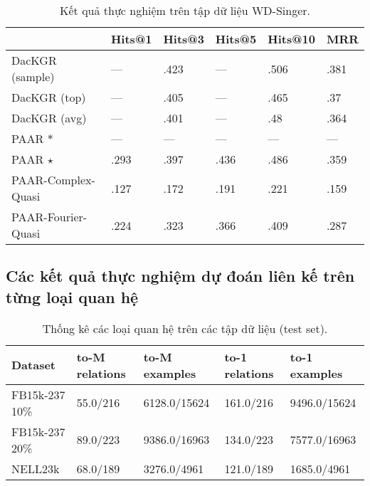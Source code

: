 \begin{center}
    \begin{table}[H]
        \centering
        \caption{Kết quả thực nghiệm trên tập dữ liệu WD-Singer.}
        \begin{tabular}{llllll}
            \toprule
         & Hits@1 & Hits@3 & Hits@5 & Hits@10 & MRR \\
            \midrule
         DacKGR (sample) & --- &  .423 & --- &  .506 &  .381\\
         DacKGR (top) & --- &  .405 &---  &  .465 & .37 \\
         DacKGR (avg) & --- & .401 & --- &  .48 & .364 \\
         PAAR $\ast$& --- & --- & --- & --- &  ---\\
         PAAR $\star$& .293 & .397 &.436 &.486&.359\\
         PAAR-Complex-Quasi &.127 &.172&.191&.221&.159\\
         PAAR-Fourier-Quasi & .224 & .323 & .366 & .409 & .287  \\
         \bottomrule
        \end{tabular}
    \end{table}
\end{center}

\subsection{Các kết quả thực nghiệm dự đoán liên kế trên từng loại quan hệ}


\begin{center}
    \begin{table}[H]
        \centering
        \caption{Thống kê các loại quan hệ trên các tập dữ liệu (test set).}
        \begin{tabular}{lllll}
        \toprule
        Dataset & to-M relations & to-M examples & to-1 relations & to-1 examples \\
        \midrule
        FB15k-237 10\%& 55.0/216 & 6128.0/15624 &  161.0/216& 9496.0/15624 \\
        FB15k-237 20\%& 89.0/223 & 9386.0/16963 & 134.0/223 & 7577.0/16963 \\
        NELL23k& 68.0/189 & 3276.0/4961 & 121.0/189 & 1685.0/4961 \\
        \bottomrule
        \end{tabular}
    \end{table}
\end{center}


